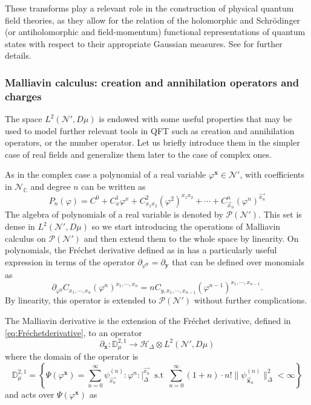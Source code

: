 \documentclass{elsarticle}%
\newcommand{\mb}[1]{{\mathbf{#1}}}
\begin{document}
These transforms play a relevant role in the construction of physical quantum field theories, as they allow for the relation of the holomorphic and  Schr\"odinger (or antiholomorphic and field-momentum)    functional representations of quantum states with respect to their appropriate Gaussian measures. See \cite{alonsoGeometricFlavours2024} for further details.






\subsubsection{Malliavin calculus: creation and annihilation operators and charges}
\label{sssec:MaliiavinCalculus}
The space $L^2(\mathcal{N}',D\mu)$ is endowed with some useful properties that may be used to model further relevant tools in QFT such as creation and annihilation operators, or the number operator. Let us briefly introduce them in the simpler case of real fields and  generalize them later to the case of complex ones.

As in the complex case a polynomial of  a real variable $\varphi^{\mb{x}}\in \mathcal{N}'$,  with coefficients in $\mathcal{N}_{\mathbb{C}}$ and degree $n$  can be written as
\begin{equation}
\label{eq:realpolynomials} 
P_n(\varphi)= C^0+C^1_x\varphi^x+C^{2}_{x_1x_2}(\varphi^2)^{x_1x_2}+\cdots+C^n_{\vec{x}_n}(\varphi^n)^{\vec{x_n}}
\end{equation}    
 The algebra of polynomials of a real variable is denoted by $\mathcal{P}(\mathcal{N}')$. This set is dense in $L^2(\mathcal{N}',D\mu)$ so we start introducing the operations of Malliavin calculus on $\mathcal{P}(\mathcal{N}')$ and then extend them to the whole space by linearity. On polynomials, the Fréchet derivative defined as in \cite{hidaWhiteNoise1993} has a particularly useful expression in terms of the operator $\partial_{\varphi^\mathbf{y}}=\partial_{\mathbf{y}}$ that can be defined over monomials as 
\begin{equation}
\label{eq:Fréchetderivative}
\partial_{\varphi^y} C_{x_1,\cdots,x_n}(\varphi^n)^{x_1,\cdots,x_n}=nC_{y,x_1,\cdots,x_{n-1}}(\varphi^{n-1})^{x_1,\cdots,x_{n-1}} .
\end{equation}
By linearity, this operator is extended  to $\mathcal{P}(\mathcal{N}')$ without further complications.

The Malliavin derivative is the extension of the Fréchet derivative, defined in \eqref{eq:Fréchetderivative}, to an operator 
\begin{equation}
\label{eq:malliavinDerivative}
\partial_\mathbf{x}: \mathbb{D}_\mu^{2,1}\longrightarrow \mathcal{H}_\Delta\otimes L^2(\mathcal{N}',D\mu)
\end{equation}
where the domain of the operator is
\begin{equation}
    \label{eq:MalliavinSovoleb}
    \mathbb{D}_\mu^{2,1}=\left\{\Psi(\varphi^\mathbf{x})=\sum_{n=0}^\infty \psi^{(n)}_{\vec{x_n}}:\varphi^n:\lvert_\Delta^{\vec{{x}_n}}\, \textrm{ s.t }\, \sum_{n=0}^\infty (1+n)\cdot n!\lVert\psi^{(n)}_{\vec{\mathbf{x}}_n}\rVert_{\Delta}^2< \infty \right\}
\end{equation}
and acts over $\Psi(\varphi^\mathbf{x})$ as
\end{document}

